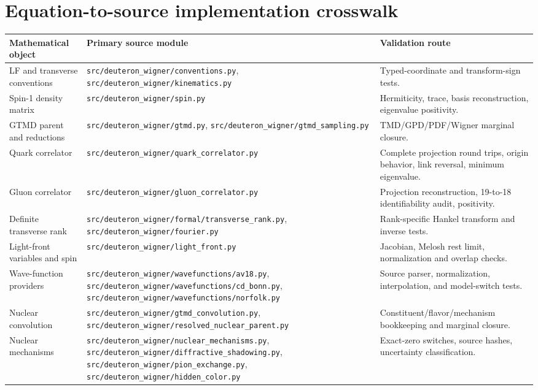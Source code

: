 \documentclass[11pt,oneside]{book}
\newcommand{\codepath}[1]{\nolinkurl{#1}}
\begin{document}
\chapter{Equation-to-source implementation crosswalk}
\label{app:crosswalk}

\begin{longtable}{p{}p{}p{}}
\toprule
\textbf{Mathematical object}&\textbf{Primary source module}&\textbf{Validation route}\\
\midrule
LF and transverse conventions&\codepath{src/deuteron_wigner/conventions.py}, \codepath{src/deuteron_wigner/kinematics.py}&Typed-coordinate and transform-sign tests.\\
Spin-1 density matrix&\codepath{src/deuteron_wigner/spin.py}&Hermiticity, trace, basis reconstruction, eigenvalue positivity.\\
GTMD parent and reductions&\codepath{src/deuteron_wigner/gtmd.py}, \codepath{src/deuteron_wigner/gtmd_sampling.py}&TMD/GPD/PDF/Wigner marginal closure.\\
Quark correlator&\codepath{src/deuteron_wigner/quark_correlator.py}&Complete projection round trips, origin behavior, link reversal, minimum eigenvalue.\\
Gluon correlator&\codepath{src/deuteron_wigner/gluon_correlator.py}&Projection reconstruction, 19-to-18 identifiability audit, positivity.\\
Definite transverse rank&\codepath{src/deuteron_wigner/formal/transverse_rank.py}, \codepath{src/deuteron_wigner/fourier.py}&Rank-specific Hankel transform and inverse tests.\\
Light-front variables and spin&\codepath{src/deuteron_wigner/light_front.py}&Jacobian, Melosh rest limit, normalization and overlap checks.\\
Wave-function providers&\codepath{src/deuteron_wigner/wavefunctions/av18.py}, \codepath{src/deuteron_wigner/wavefunctions/cd_bonn.py}, \codepath{src/deuteron_wigner/wavefunctions/norfolk.py}&Source parser, normalization, interpolation, and model-switch tests.\\
Nuclear convolution&\codepath{src/deuteron_wigner/gtmd_convolution.py}, \codepath{src/deuteron_wigner/resolved_nuclear_parent.py}&Constituent/flavor/mechanism bookkeeping and marginal closure.\\
Nuclear mechanisms&\codepath{src/deuteron_wigner/nuclear_mechanisms.py}, \codepath{src/deuteron_wigner/diffractive_shadowing.py}, \codepath{src/deuteron_wigner/pion_exchange.py}, \codepath{src/deuteron_wigner/hidden_color.py}&Exact-zero switches, source hashes, uncertainty classification.\\

\end{longtable}
\end{document}
